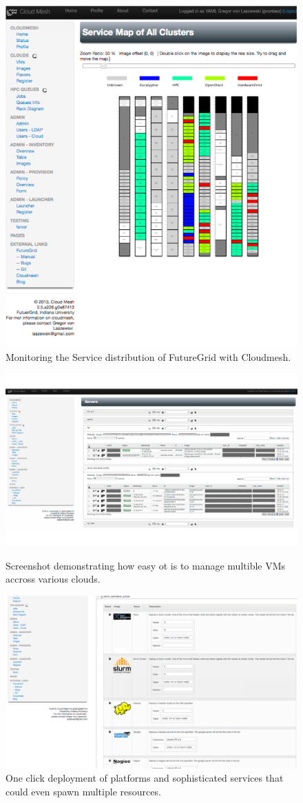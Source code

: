 \documentclass[graybox]{svmult}
\begin{document}
\begin{figure}[htb]
 \centering
   \includegraphics[width=.7\textwidth]{images/rainbow.pdf}
 \caption{Monitoring the Service distribution of FutureGrid with Cloudmesh.}
\end{figure}

\begin{figure}[htb]
 \centering
   \includegraphics[width=.9\textwidth]{images/instances.pdf}
 \caption{Screenshot demonstrating how easy ot is to manage multible VMs accross various clouds.}\label{F:instances}
 \centering
   \includegraphics[width=.9\textwidth]{images/oneclick.pdf}
 \caption{One click deployment of platforms and sophisticated
   services that could even spawn multiple resources.}\label{F:oneclick}
\end{figure}
\end{document}
